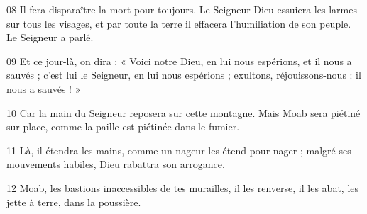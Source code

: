 
08 Il fera disparaître la mort pour toujours. Le Seigneur Dieu essuiera les larmes sur tous les visages, et par toute la terre il effacera l’humiliation de son peuple. Le Seigneur a parlé.

09 Et ce jour-là, on dira : « Voici notre Dieu, en lui nous espérions, et il nous a sauvés ; c’est lui le Seigneur, en lui nous espérions ; exultons, réjouissons-nous : il nous a sauvés ! »

10 Car la main du Seigneur reposera sur cette montagne. Mais Moab sera piétiné sur place, comme la paille est piétinée dans le fumier.

11 Là, il étendra les mains, comme un nageur les étend pour nager ; malgré ses mouvements habiles, Dieu rabattra son arrogance.

12 Moab, les bastions inaccessibles de tes murailles, il les renverse, il les abat, les jette à terre, dans la poussière.